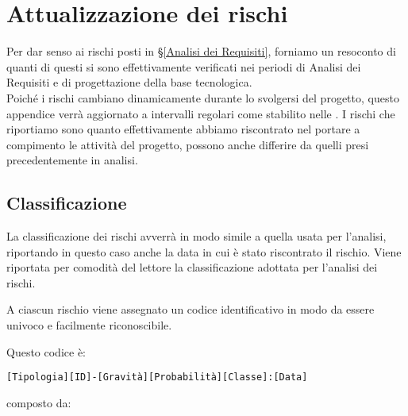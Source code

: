 
\newpage
\section{Attualizzazione dei rischi} \label{AttualizzazioneDeiRischi}
    Per dar senso ai rischi posti in \S\ref{Analisi dei Requisiti}, forniamo un resoconto di quanti di questi si sono effettivamente verificati nei periodi di Analisi dei Requisiti e di progettazione della base tecnologica.\\
    Poiché i rischi cambiano dinamicamente durante lo svolgersi del progetto, questo appendice verrà aggiornato a intervalli regolari come stabilito nelle \NdPd.
    I rischi che riportiamo sono quanto effettivamente abbiamo riscontrato nel portare a compimento le attività del progetto, possono anche differire da quelli presi precedentemente in analisi.\\

	\subsection{Classificazione}
    La classificazione dei rischi avverrà in modo simile a quella usata per l'analisi, riportando in questo caso anche la data in cui è stato riscontrato il rischio.
    Viene riportata per comodità del lettore la classificazione adottata per l'analisi dei rischi.

	A ciascun rischio viene assegnato un codice identificativo in modo da essere univoco e facilmente riconoscibile.

	Questo codice è:

	\begin{center}
		\texttt{[Tipologia][ID]-[Gravità][Probabilità][Classe]:[Data]}
	\end{center}

	composto da:
	
